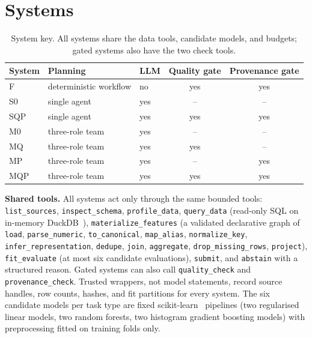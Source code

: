 \documentclass[conference]{IEEEtran}
\newcommand{\sys}[1]{\textsf{#1}}
\begin{document}
\section{Systems}
\label{sec:systems}
\begin{table}[t]
\caption{System key. All systems share the data tools, candidate models, and budgets; gated systems also have the two check tools.}
\label{tab:systems}
\centering\footnotesize\setlength{\tabcolsep}{5pt}
\begin{tabular}{@{}lllcc@{}}
\toprule
System & Planning & LLM & Quality gate & Provenance gate \\
\midrule
\sys{F}   & deterministic workflow & no  & yes & yes \\
\sys{S0}  & single agent           & yes & --  & -- \\
\sys{SQP} & single agent           & yes & yes & yes \\
\sys{M0}  & three-role team        & yes & --  & -- \\
\sys{MQ}  & three-role team        & yes & yes & -- \\
\sys{MP}  & three-role team        & yes & --  & yes \\
\sys{MQP} & three-role team        & yes & yes & yes \\
\bottomrule
\end{tabular}
\end{table}

\textbf{Shared tools.} All systems act only through the same bounded tools: \texttt{list\_sources},
\texttt{inspect\_schema}, \texttt{profile\_data}, \texttt{query\_data} (read-only SQL on in-memory
DuckDB~\cite{raasveldt2019duckdb}), \texttt{materialize\_features} (a validated declarative graph of
\texttt{load}, \texttt{parse\_numeric}, \texttt{to\_canonical}, \texttt{map\_alias}, \texttt{normalize\_key},
\texttt{infer\_representation}, \texttt{dedupe}, \texttt{join}, \texttt{aggregate}, \texttt{drop\_missing\_rows},
\texttt{project}), \texttt{fit\_evaluate} (at most six candidate evaluations), \texttt{submit}, and \texttt{abstain}
with a structured reason. Gated systems can also call \texttt{quality\_check} and \texttt{provenance\_check}. Trusted
wrappers, not model statements, record source handles, row counts, hashes, and fit partitions for every system. The
six candidate models per task type are fixed scikit-learn~\cite{pedregosa2011sklearn} pipelines (two regularised
linear models, two random forests, two histogram gradient boosting models) with preprocessing fitted on training
folds only.
\end{document}

